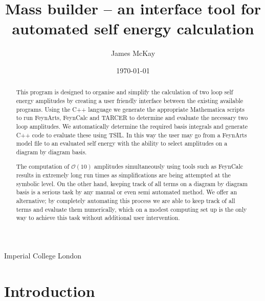 



\def\A{\mathcal{A}}
\def\B{\mathcal{B}}
\def\C{\mathcal{C}}


\newcommand{\mb}{\textsf{Mass Builder} \! }
\newcommand{\tsil}{\textsf{TSIL} \! }
\newcommand{\tarcer}{\textsf{TARCER} \! }

\graphicspath{ {Figures/}}

\title{Mass builder -- an interface tool for automated self energy calculation}
%
\author
{
  James McKay
}
%
%
\institute
{
  Imperial College London\label{addr1}
}
%
\date{\today}

\maketitle

\begin{abstract}

This program is designed to organise and simplify the calculation of two loop self energy amplitudes by creating a user friendly interface between the existing available programs.  Using the C++ language we generate the appropriate Mathematica scripts to run FeynArts, FeynCalc and TARCER to determine and evaluate the necessary two loop amplitudes.  We automatically determine the required basis integrals and generate C++ code to evaluate these using TSIL.  In this way the user may go from a FeynArts model file to an evaluated self energy with the ability to select amplitudes on a diagram by diagram basis.

The computation of $\mathcal{O}(10)$ amplitudes simultaneously using tools such as FeynCalc results in extremely long run times as simplifications are being attempted at the symbolic level.  On the other hand, keeping track of all terms on a diagram by diagram basis is a serious task by any manual or even semi automated method.  We offer an alternative; by completely automating this process we are able to keep track of all terms and evaluate them numerically, which on a modest computing set up is the only way to achieve this task without additional user intervention.

\end{abstract}

\tableofcontents

\section{Introduction}

